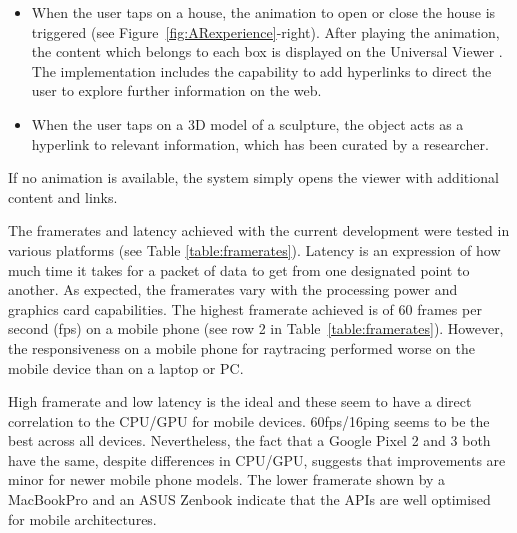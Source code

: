 \documentclass[acmlarge,screen,dvipsnames]{acmart}
\begin{document}
\begin{itemize}
\item When the user taps on a house, the animation to open or close the house
is triggered (see Figure~\ref{fig:ARexperience}-right). After playing the
animation, the content which belongs to each box is displayed on the Universal
Viewer \cite{uv}. The implementation includes the capability to add hyperlinks
to direct the user to explore further information on the web. 
\item When the
user taps on a 3D model of a sculpture, the object acts as a hyperlink to
relevant information, which has been curated by a researcher.  
\end{itemize}

If no animation is available, the system simply opens the viewer with additional content and links.
\color{black}


The framerates and latency achieved with the current development were tested
in various platforms (see Table \ref{table:framerates}). Latency is an
expression of how much time it takes for a packet of data to get from one
designated point to another. As expected, the framerates vary with the
processing power and graphics card capabilities. The highest framerate
achieved is of 60 frames per second (fps) on a mobile phone (see row 2 in
Table~\ref{table:framerates}). However, the responsiveness on a mobile phone for
raytracing performed worse on the mobile device than on a laptop or PC.

High framerate and low latency is the ideal and these seem to have a direct
correlation to the CPU/GPU for mobile devices. 60fps/16ping seems to be the
best across all devices. Nevertheless, the fact that a Google Pixel 2 and 3 both
have the same, despite differences in CPU/GPU, suggests that improvements are minor
for newer mobile phone models. The lower framerate shown by a MacBookPro
and an ASUS Zenbook indicate that the APIs are well optimised for mobile
architectures.
\end{document}
